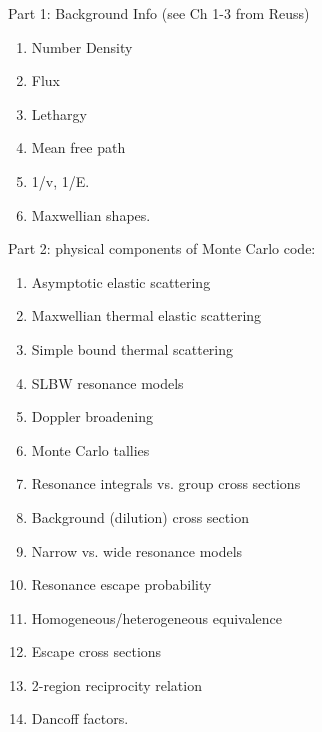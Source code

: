\documentclass{school-22.211-notes}
\begin{document}
Part 1: Background Info (see Ch 1-3 from Reuss)
\begin{enumerate}
\item Number Density
\item Flux
\item Lethargy
\item Mean free path
\item 1/v, 1/E.
\item Maxwellian shapes.
\end{enumerate}


Part 2: physical components of Monte Carlo code:
\begin{enumerate}
\item Asymptotic elastic scattering
\item Maxwellian thermal elastic scattering
\item Simple bound thermal scattering
\item SLBW resonance models
\item Doppler broadening
\item Monte Carlo tallies
\item Resonance integrals vs. group cross sections
\item Background (dilution) cross section
\item Narrow vs. wide resonance models
\item Resonance escape probability
\item Homogeneous/heterogeneous equivalence
\item Escape cross sections
\item 2-region reciprocity relation
\item Dancoff factors.
\end{enumerate}
\end{document}
